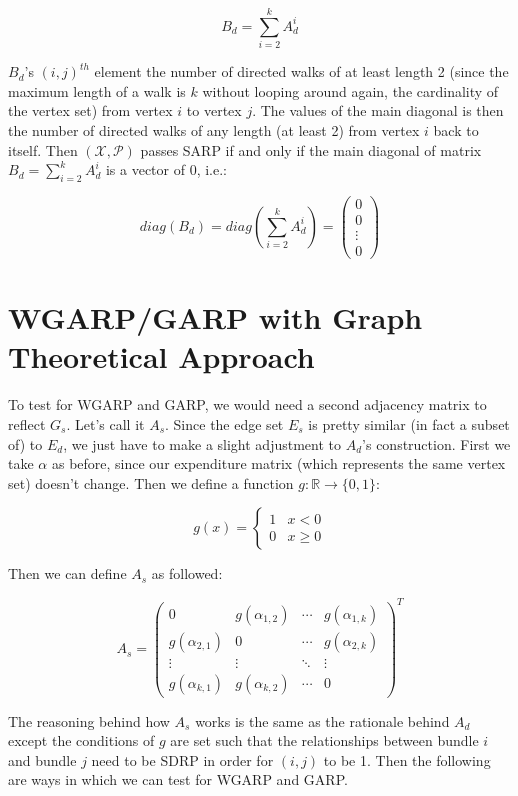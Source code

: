 \documentclass{article} %
\begin{document}
$$B_d=\sum_{i=2}^{k}A_d^i$$

$B_d$'s $(i,j)^{th}$ element the number of directed walks of at least length 2 (since the maximum length of a walk is $k$ without looping around again, the cardinality of the vertex set) from vertex $i$ to vertex $j$. The values of the main diagonal is then the number of directed walks of any length (at least 2) from vertex $i$ back to itself. Then $(\mathcal{X},\mathcal{P})$ passes SARP if and only if the main diagonal of matrix $B_d=\sum_{i=2}^{k}A_d^i$ is a vector of 0, i.e.:

\[
diag(B_d) = diag(\sum_{i=2}^{k}A_d^i)=
 \begin{pmatrix}
  0 \\
  0 \\
  \vdots \\
  0
 \end{pmatrix}
\]

\section{WGARP/GARP with Graph Theoretical Approach}

To test for WGARP and GARP, we would need a second adjacency matrix to reflect $G_s$. Let's call it $A_s$. Since the edge set $E_s$ is pretty similar (in fact a subset of) to $E_d$, we just have to make a slight adjustment to $A_d$'s construction. First we take $\alpha$ as before, since our expenditure matrix (which represents the same vertex set) doesn't change. Then we define a function $g:\mathbb{R}\to\{0,1\}$:

\[ 
g(x)=
    \begin{cases} 
      1 & x<0 \\
      0 & x\geq0
   \end{cases}
\]

Then we can define $A_s$ as followed:

\[
A_s =
 \begin{pmatrix}
  0 & g(\alpha_{1,2}) & \cdots & g(\alpha_{1,k}) \\
  g(\alpha_{2,1}) & 0 & \cdots & g(\alpha_{2,k}) \\
  \vdots  & \vdots  & \ddots & \vdots  \\
  g(\alpha_{k,1}) & g(\alpha_{k,2}) & \cdots & 0
 \end{pmatrix} ^T
\]

The reasoning behind how $A_s$ works is the same as the rationale behind $A_d$ except the conditions of $g$ are set such that the relationships between bundle $i$ and bundle $j$ need to be SDRP in order for $(i,j)$ to be 1. Then the following are ways in which we can test for WGARP and GARP.
\end{document}
